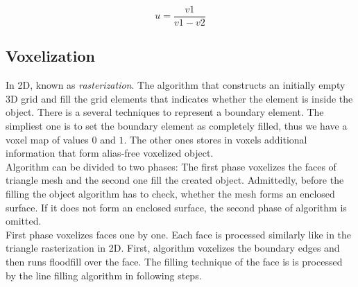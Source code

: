 \begin{equation}
u = \frac{v1}{v1-v2}
\end{equation}


\subsection{Voxelization}
\label{sub:vox}

In 2D, known as \emph{rasterization}. The algorithm that constructs an initially empty 3D grid and fill 
the
grid elements that indicates whether the element is inside the object\cite{Cohen-Or1995}. There is a several techniques
to represent a boundary element. The simpliest one is to set the boundary element as completely filled, 
thus we have a voxel map of values $0$ and $1$. The other ones stores in voxels additional
information that form alias-free voxelized object. \cite{Wang1993}\\

Algorithm can be divided to two phases: The first phase voxelizes the faces of triangle mesh and the
second one fill the created object. Admittedly, before the filling the object algorithm has to check,
whether the mesh forms an enclosed surface. If it does not form an enclosed surface, the second phase of
algorithm is omitted.\\

First phase voxelizes faces one by one. Each face is processed similarly like in the triangle 
rasterization in 2D.
First, algorithm voxelizes the boundary edges and then runs floodfill over the face. The filling
technique of the face is is processed by the line filling algorithm in following steps. 

